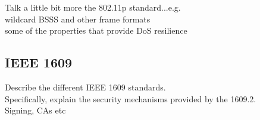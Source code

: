 Talk a little bit more the 802.11p standard...e.g. \\
wildcard BSSS and other frame formats\\
some of the properties that provide DoS resilience\\

\subsection{IEEE 1609}
Describe the different IEEE 1609 standards. \\
Specifically, explain the security mechanisms provided by the 1609.2.\\
Signing, CAs etc\\